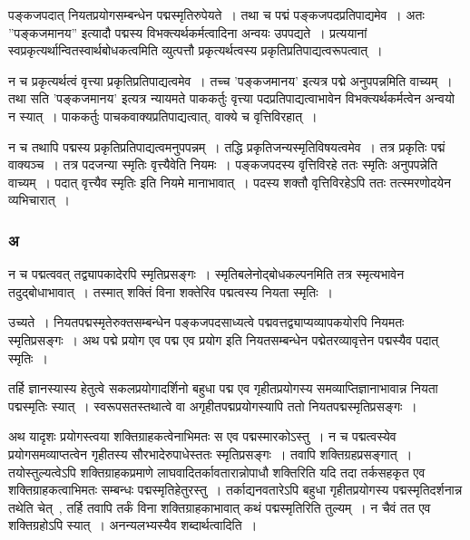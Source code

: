 			पङ्कजपदात् नियतप्रयोगसम्बन्धेन पद्मस्मृतिरुपेयते~।  तथा च पद्मं पङ्कजपदप्रतिपाद्यमेव~। अतः ”पङ्कजमानय” इत्यादौ पद्मस्य विभक्त्यर्थकर्मत्वादिना अन्वयः उपपद्यते~।  प्रत्ययानां स्वप्रकृत्यर्थान्वितस्वार्थबोधकत्वमिति व्युत्पत्तौ प्रकृत्यर्थत्वस्य प्रकृतिप्रतिपाद्यत्वरूपत्वात्~। 

			न च प्रकृत्यर्थत्वं वृत्त्या प्रकृतिप्रतिपाद्यत्वमेव~।  तच्च ’पङ्कजमानय’ इत्यत्र पद्मे अनुपपन्नमिति वाच्यम्~।  तथा सति ’पङ्कजमानय’ इत्यत्र न्यायमते पाककर्तुः  वृत्त्या पदप्रतिपाद्यत्वाभावेन  विभक्त्यर्थकर्मत्वेन अन्वयो न स्यात्~।  पाककर्तुः पाचकवाक्यप्रतिपाद्यत्वात्, वाक्ये च वृत्तिविरहात्~। 

			न च तथापि पद्मस्य प्रकृतिप्रतिपाद्यत्वमनुपपन्नम्~।  तद्धि प्रकृतिजन्यस्मृतिविषयत्वमेव~।  तत्र प्रकृतिः पद्मं वाक्यञ्च~।  तत्र पदजन्या स्मृतिः वृत्त्यैवेति नियमः~।  पङ्कजपदस्य वृत्तिविरहे ततः स्मृतिः अनुपपन्नेति वाच्यम्~।  पदात् वृत्त्यैव स्मृतिः इति नियमे मानाभावात्~।  पदस्य शक्तौ वृत्तिविरहेऽपि ततः तत्स्मरणोदयेन व्यभिचारात्~।
		
			\subsubsection{अ}
			
				\begin{small}
				
					न च पद्मत्ववत् तद्व्यापकादेरपि स्मृतिप्रसङ्गः~। स्मृतिबलेनोद्बोधकल्पनमिति तत्र स्मृत्यभावेन तदुद्बोधाभावात्~। तस्मात् शक्तिं विना शक्तेरिव पद्मत्वस्य नियता स्मृतिः~। 
				
					उच्यते~। नियतपद्मस्मृतेरुक्तसम्बन्धेन पङ्कजपदसाध्यत्वे पद्मवत्तद्व्याप्यव्यापकयोरपि नियमतः स्मृतिप्रसङ्गः~। अथ पद्मे प्रयोग एव पद्म एव प्रयोग इति नियतसम्बन्धेन पद्मेतरव्यावृत्तेन पद्मस्यैव पदात् स्मृतिः~। 
				
					तर्हि ज्ञानस्यास्य हेतुत्वे सकलप्रयोगादर्शिनो बहुधा पद्म एव गृहीतप्रयोगस्य समव्याप्तिज्ञानाभावान्न नियता पद्मस्मृतिः स्यात्~। स्वरूपसतस्तथात्वे वा अगृहीतपद्मप्रयोगस्यापि ततो नियतपद्मस्मृतिप्रसङ्गः~। 
	
					अथ यादृशः प्रयोगस्त्वया शक्तिग्राहकत्वेनाभिमतः स एव पद्मस्मारकोऽस्तु~। न च पद्मत्वस्येव प्रयोगसमव्याप्तत्वेन गृहीतस्य सौरभादेरुपाधेस्ततः स्मृतिप्रसङ्गः~। तवापि शक्तिग्रहप्रसङ्गात्~। तयोस्तुल्यत्वेऽपि शक्तिग्राहकप्रमाणे लाघवादितर्कावतारान्नोपाधौ शक्तिरिति यदि तदा तर्कसहकृत एव शक्तिग्राहकत्वाभिमतः सम्बन्धः पद्मस्मृतिहेतुरस्तु~। तर्काद्यनवतारेऽपि बहुधा गृहीतप्रयोगस्य पद्मस्मृतिदर्शनान्न तथेति चेत्~, तर्हि तवापि तर्कं विना शक्तिग्राहकाभावात् कथं पद्मस्मृतिरिति तुल्यम्~। न चैवं तत एव शक्तिग्रहोऽपि स्यात्~। अनन्यलभ्यस्यैव शब्दार्थत्वादिति~। 
				\end{small}
				
